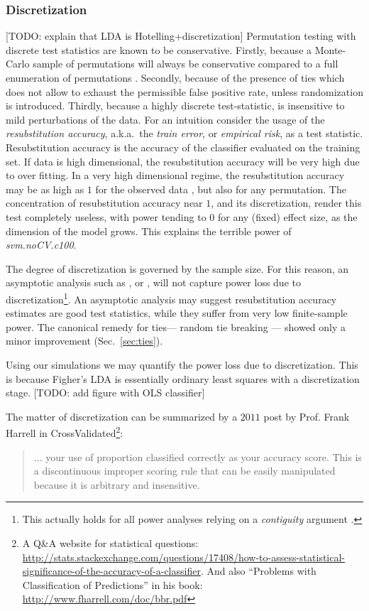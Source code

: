 \documentclass[journal]{IEEEtran}
\begin{document}
\subsubsection{Discretization}
[TODO: explain that LDA is Hotelling+discretization]
Permutation testing with discrete test statistics are known to be conservative.
Firstly, because a Monte-Carlo sample of permutations will always be conservative compared to a full enumeration of permutations \cite{hemerik_exact_2014}.
Secondly, because of the presence of ties which does not allow to exhaust the permissible false positive rate, unless randomization is introduced.
Thirdly, because a highly discrete test-statistic, is insensitive to mild perturbations of the data.
For an intuition consider the usage of the \emph{resubstitution accuracy}, a.k.a.\ the \emph{train error}, or \emph{empirical risk}, as a test statistic. 
Resubstitution accuracy is the accuracy of the classifier evaluated on the training set.
If data is high dimensional, the resubstitution accuracy will be very high due to over fitting. 
In a very high dimensional regime, the resubstitution accuracy may be as high as $1$ for the observed data \cite[Theorem 1]{mclachlan_bias_1976}, but also for any permutation.
The concentration of resubstitution accuracy near $1$, and its discretization, render this test completely useless, with power tending to $0$ for any (fixed) effect size, as the dimension of the model grows. 
This explains the terrible power of \emph{svm.noCV.c100}.

The degree of discretization is governed by the sample size. 
For this reason, an asymptotic analysis such as \cite{ramdas_classification_2016}, or \cite{golland_permutation_2005}, will not capture power loss due to discretization\footnote{This actually holds for all power analyses relying on a \emph{contiguity} argument \cite[Ch.6]{vaart_asymptotic_1998}.}.
An asymptotic analysis may suggest resubstitution accuracy estimates are good test statistics, while they suffer from very low finite-sample power. 
The canonical remedy for ties--- random tie breaking --- showed only a minor improvement (Sec.~\ref{sec:ties}).

Using our simulations we may quantify the power loss due to discretization. 
This is because Figher's LDA is essentially ordinary least squares with a discretization stage. 
[TODO: add figure with OLS classifier]

The matter of discretization can be summarized by a $2011$ post by Prof. Frank Harrell in \textsf{CrossValidated\footnote{A Q\&A website for statistical questions: \url{http://stats.stackexchange.com/questions/17408/how-to-assess-statistical-significance-of-the-accuracy-of-a-classifier}. And also ``Problems with Classification of Predictions'' in his book: \url{http://www.fharrell.com/doc/bbr.pdf}}}:
\begin{quote}
	... your use of proportion classified correctly as your accuracy score. This is a discontinuous improper scoring rule that can be easily manipulated because it is arbitrary and insensitive.
\end{quote}
\end{document}
